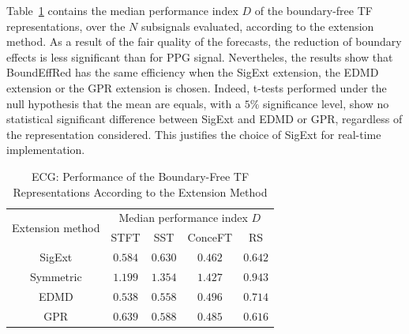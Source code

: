 \documentclass[journal,onecolumn]{IEEEtran}
\begin{document}
Table~\ref{tab:otd.ecg} contains the median performance index $D$ of the boundary-free TF representations, over the $N$ subsignals evaluated, according to the extension method. As a result of the fair quality of the forecasts, the reduction of boundary effects is less significant than for PPG signal. Nevertheles, the results show that {\sf BoundEffRed} has the same efficiency when the {\sf SigExt} extension, the EDMD extension or the GPR extension is chosen. Indeed, t-tests performed under the null hypothesis that the mean are equals, with a $5\%$ significance level, show no statistical significant difference between {\sf SigExt} and EDMD or GPR, regardless of the representation considered. This justifies the choice of {\sf SigExt} for real-time implementation.

\begin{table}
\centering
\caption{ECG: Performance of the Boundary-Free TF Representations According to the Extension Method}
\begin{tabular}{|c||c|c|c|c|}
  \hline
   \multirow{2}{40pt}{\centering Extension method} & \multicolumn{4}{c|}{Median performance index $D$} \\
   \cline{2-5}
      & STFT & SST & ConceFT & RS\\
   \hhline{|=#=|=|=|=|}
   {\sf SigExt} & $0.584$ & $0.630$ & $0.462$ & $0.642$ \\
   \hline
   Symmetric & $1.199$ & $1.354$ & $1.427$ & $0.943$ \\
   \hline
   EDMD & $0.538$ & $0.558$ & $0.496$ & $0.714$ \\
   \hline
   GPR & $0.639$ & $0.588$ & $0.485$ & $0.616$ \\
   \hline
\end{tabular}
\label{tab:otd.ecg}
\end{table}
\end{document}
